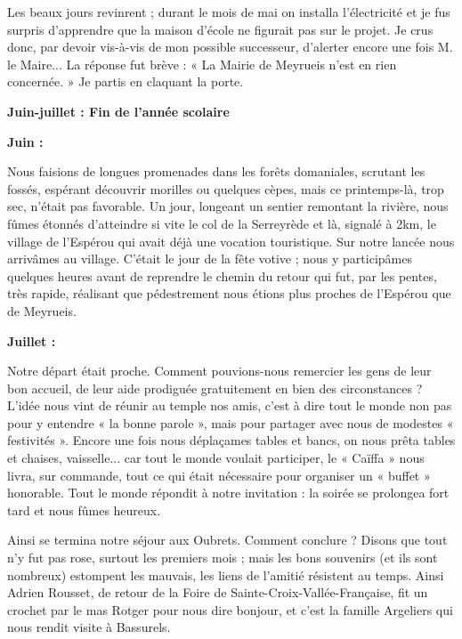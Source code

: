 Les beaux jours revinrent ; durant le mois de mai on installa l’électricité et je fus
surpris d’apprendre que la maison d’école ne figurait pas sur le projet. Je crus donc,
par devoir vis-à-vis de mon possible successeur, d’alerter encore une fois M. le
Maire... La réponse fut brève : « La Mairie de Meyrueis n’est en rien concernée. » Je
partis en claquant la porte.

\begin{center}
\textbf{Juin-juillet : Fin de l’année scolaire}
\end{center}

\textbf{Juin :}

Nous faisions de longues promenades dans les forêts domaniales, scrutant les fossés,
espérant découvrir morilles ou quelques cèpes, mais ce printemps-là, trop sec, n’était
pas favorable. Un jour, longeant un sentier remontant la rivière, nous fûmes étonnés
d’atteindre si vite le col de la Serreyrède et là, signalé à 2km, le village de l’Espérou
qui avait déjà une vocation touristique. Sur notre lancée nous arrivâmes au village.
C’était le jour de la fête votive ; nous y participâmes quelques heures avant de
reprendre le chemin du retour qui fut, par les pentes, très rapide, réalisant que
pédestrement nous étions plus proches de l’Espérou que de Meyrueis.

\textbf{Juillet :}

Notre départ était proche. Comment pouvions-nous remercier les gens de leur bon
accueil, de leur aide prodiguée gratuitement en bien des circonstances ?
L’idée nous vint de réunir au temple nos amis, c’est à dire tout le monde non pas pour
y entendre « la bonne parole », mais pour partager avec nous de modestes
« festivités ». Encore une fois nous déplaçames tables et bancs, on nous prêta tables et
chaises, vaisselle... car tout le monde voulait participer, le « Caïffa » nous livra, sur
commande, tout ce qui était nécessaire pour organiser un « buffet » honorable. Tout le
monde répondit à notre invitation : la soirée se prolongea fort tard et nous fûmes
heureux.


Ainsi se termina notre séjour aux Oubrets. Comment conclure ? Disons que tout n’y
fut pas rose, surtout les premiers mois ; mais les bons souvenirs (et ils sont
nombreux) estompent les mauvais, les liens de l’amitié résistent au temps. Ainsi
Adrien Rousset, de retour de la Foire de Sainte-Croix-Vallée-Française, fit un crochet
par le mas Rotger pour nous dire bonjour, et c’est la famille Argeliers qui nous rendit
visite à Bassurels.

